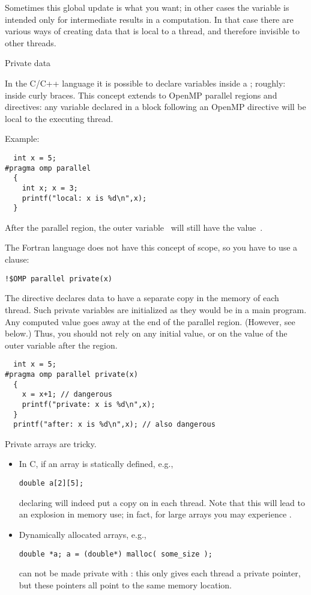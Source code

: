 Sometimes this global update is what you want; in other cases the
variable is intended only for intermediate results in a computation.
In that case 
there are various ways of creating
data that is local to a thread, and therefore invisible to other threads.

 {Private data}

In the C/C++ language it is possible to declare variables inside
a ; roughly: inside curly braces.
This concept extends to OpenMP parallel regions and directives:
any variable declared in a block following an OpenMP directive
will be local to the executing thread.

Example:
\begin{verbatim}
  int x = 5;
#pragma omp parallel
  {
    int x; x = 3;
    printf("local: x is %d\n",x);
  }
\end{verbatim}
After the parallel region, the outer variable~ will still have the value~.

The Fortran language does not have this concept of scope, so you have to use a
 clause:
\begin{verbatim}
!$OMP parallel private(x)
\end{verbatim}

The  directive declares data to have a separate copy 
in the memory of each thread. 
Such private variables are initialized as they would be in a main program.
Any computed value goes away at the end 
of the parallel region. (However, see below.)
Thus, you should not rely on any initial value, or on the value of the outer variable
after the region.

\begin{verbatim}
  int x = 5;
#pragma omp parallel private(x)
  {
    x = x+1; // dangerous
    printf("private: x is %d\n",x);
  }
  printf("after: x is %d\n",x); // also dangerous
\end{verbatim}

Private arrays are tricky.
\begin{itemize}
\item In C, if an array is statically defined, e.g.,
\begin{verbatim}
double a[2][5];
\end{verbatim}
declaring  will indeed put a copy on in each thread.
Note that this will lead to an explosion in memory use; in fact, for large arrays you
  may experience .
\item Dynamically allocated arrays, e.g.,
\begin{verbatim}
double *a; a = (double*) malloc( some_size );
\end{verbatim}
can not be made private with : this only gives each thread 
a private pointer, but these pointers all point to the same memory location.
\end{itemize}

